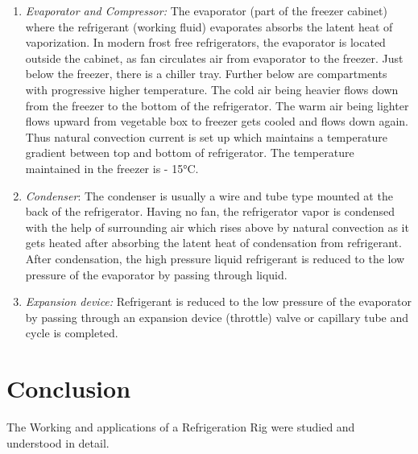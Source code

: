 \documentclass[11pt]{article}
\begin{document}
\begin{enumerate}
\item \textit{Evaporator and Compressor:} The evaporator (part of the freezer cabinet) where the refrigerant (working fluid) evaporates absorbs the latent heat of vaporization. In modern frost free refrigerators, the evaporator is located outside the cabinet, as fan circulates air from evaporator to the freezer. Just below the freezer, there is a chiller tray. Further below are compartments with progressive higher temperature. The cold air being heavier flows down from the freezer to the bottom of the refrigerator. The warm air being lighter flows upward from vegetable box to freezer gets cooled and flows down again. Thus natural convection current is set up which maintains a temperature gradient between top and bottom of refrigerator. The temperature maintained in the freezer is - 15°C. \\

\item \textit{Condenser}: The condenser is usually a wire and tube type mounted at the back of the refrigerator. Having no fan, the refrigerator vapor is condensed with the help
of surrounding air which rises above by natural convection as it gets heated after absorbing the latent heat of condensation from refrigerant. After condensation, the high pressure liquid refrigerant is reduced to the low pressure of the evaporator by passing through liquid.

\item \textit{Expansion device:} Refrigerant is reduced to the low pressure of the evaporator by passing through an expansion device (throttle) valve or capillary tube and cycle is completed.

\end{enumerate}




\section{Conclusion}
	
The Working and applications of a Refrigeration Rig were studied and understood in detail. 

\pagebreak
\end{document}
